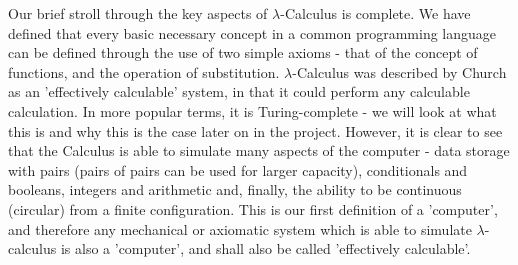 \documentclass {article}
\begin{document}
Our brief stroll through the key aspects of $\lambda$-Calculus is complete. We have defined that every basic necessary concept in a common programming language can be defined through the use of two simple axioms - that of the concept of functions, and the operation of substitution. $\lambda$-Calculus was described by Church as an 'effectively calculable' system, in that it could perform any calculable calculation. In more popular terms, it is Turing-complete - we will look at what this is and why this is the case later on in the project. However, it is clear to see that the Calculus is able to simulate many aspects of the computer - data storage with pairs (pairs of pairs can be used for larger capacity), conditionals and booleans, integers and arithmetic and, finally, the ability to be continuous (circular) from a finite configuration. This is our first definition of a 'computer', and therefore any mechanical or axiomatic system which is able to simulate $\lambda$-calculus is also a 'computer', and shall also be called 'effectively calculable'.
\end{document}
